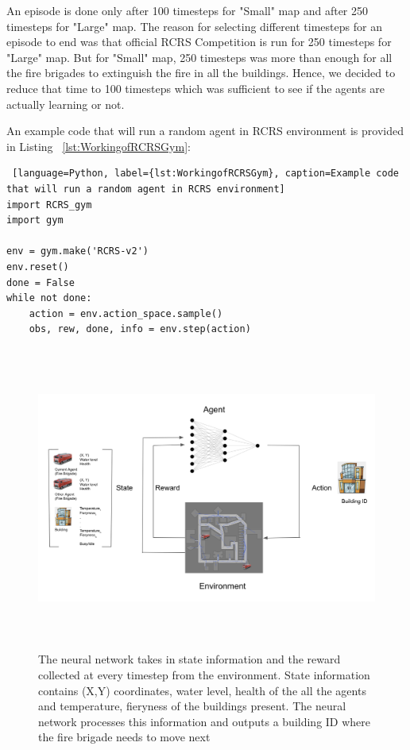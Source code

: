 \documentclass[12pt]{report}
\begin{document}
An episode is done only after 100 timesteps for "Small" map and after 250 timesteps for "Large" map. The reason for selecting different timesteps for an episode to end was that official RCRS Competition is run for 250 timesteps for "Large" map. But for "Small" map, 250 timesteps was more than enough for all the fire brigades to extinguish the fire in all the buildings. Hence, we decided to reduce that time to 100 timesteps which was sufficient to see if the agents are actually learning or not. 

An example code that will run a random agent in RCRS environment is provided in Listing ~\ref{lst:WorkingofRCRSGym}:

\begin{lstlisting} [language=Python, label={lst:WorkingofRCRSGym}, caption=Example code that will run a random agent in RCRS environment] 
import RCRS_gym
import gym

env = gym.make('RCRS-v2')
env.reset()
done = False
while not done:
    action = env.action_space.sample()
    obs, rew, done, info = env.step(action)

\end{lstlisting}

\begin{figure}[!h]
    \centering
    \includegraphics[height=10cm, width=17cm]{23}
    \caption{The neural network takes in state information and the reward collected at every timestep from the environment. State information contains (X,Y) coordinates, water level, health of the all the agents and temperature, fieryness of the buildings present. The neural network processes this information and outputs a building ID where the fire brigade needs to move next}
    \label{fig:23}
\end{figure}
\end{document}
